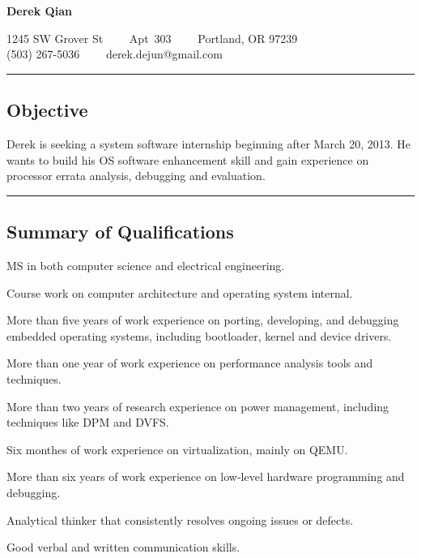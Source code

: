 \documentclass[10pt,letterpaper]{article}
\newenvironment{indentsection}[1]%
{\begin{list}{}%
	{\setlength{\leftmargin}{#1}}%
	\item[]%
}
{\end{list}}
\begin{document}
\begin{center}
{\LARGE \textbf{Derek Qian}}

1245 SW Grover St\ \ \textbullet
\ \ Apt\ 303\ \ \textbullet
\ \ Portland, OR 97239
\\
(503) 267-5036\ \ \textbullet
\ \ derek.dejun@gmail.com
\end{center}

\hrule
\vspace{-0.4em}
\subsection*{Objective}

\begin{indentsection}{\parindent}
Derek is seeking a system software internship beginning after March 20, 2013. He wants to build his OS software enhancement skill and gain experience on processor errata analysis, debugging and evaluation.
\end{indentsection}

\hrule
\vspace{-0.4em}
\subsection*{Summary of Qualifications}
\begin{itemize*}
	\item MS in both computer science and electrical engineering.
	\item Course work on computer architecture and operating system internal.
	\item More than five years of work experience on porting, developing, and debugging embedded operating systems, including bootloader, kernel and device drivers.
	\item More than one year of work experience on performance analysis tools and techniques.
	\item More than two years of research experience on power management, including techniques like DPM and DVFS.
	\item Six monthes of work experience on virtualization, mainly on QEMU.
	\item More than six years of work experience on low-level hardware programming and debugging.
	\item Analytical thinker that consistently resolves ongoing issues or defects.
	\item Good verbal and written communication skills.
\end{itemize*}
\end{document}
